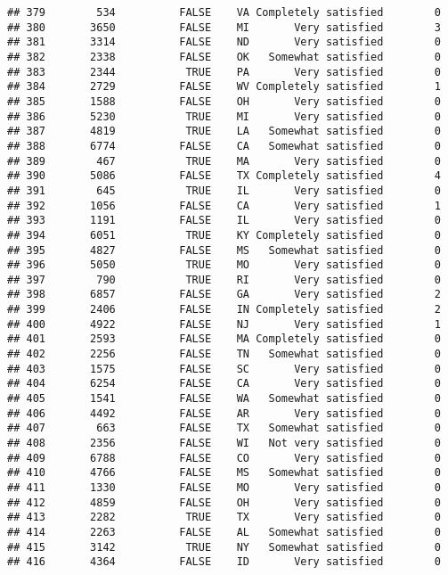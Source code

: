 \documentclass[]{book}
\theoremstyle{definition}
\theoremstyle{definition}
\theoremstyle{remark}
\begin{document}
\begin{verbatim}
## 379        534          FALSE    VA Completely satisfied        0
## 380       3650          FALSE    MI       Very satisfied        3
## 381       3314          FALSE    ND       Very satisfied        0
## 382       2338          FALSE    OK   Somewhat satisfied        0
## 383       2344           TRUE    PA       Very satisfied        0
## 384       2729          FALSE    WV Completely satisfied        1
## 385       1588          FALSE    OH       Very satisfied        0
## 386       5230           TRUE    MI       Very satisfied        0
## 387       4819           TRUE    LA   Somewhat satisfied        0
## 388       6774          FALSE    CA   Somewhat satisfied        0
## 389        467           TRUE    MA       Very satisfied        0
## 390       5086          FALSE    TX Completely satisfied        4
## 391        645           TRUE    IL       Very satisfied        0
## 392       1056          FALSE    CA       Very satisfied        1
## 393       1191          FALSE    IL       Very satisfied        0
## 394       6051           TRUE    KY Completely satisfied        0
## 395       4827          FALSE    MS   Somewhat satisfied        0
## 396       5050           TRUE    MO       Very satisfied        0
## 397        790           TRUE    RI       Very satisfied        0
## 398       6857          FALSE    GA       Very satisfied        2
## 399       2406          FALSE    IN Completely satisfied        2
## 400       4922          FALSE    NJ       Very satisfied        1
## 401       2593          FALSE    MA Completely satisfied        0
## 402       2256          FALSE    TN   Somewhat satisfied        0
## 403       1575          FALSE    SC       Very satisfied        0
## 404       6254          FALSE    CA       Very satisfied        0
## 405       1541          FALSE    WA   Somewhat satisfied        0
## 406       4492          FALSE    AR       Very satisfied        0
## 407        663          FALSE    TX   Somewhat satisfied        0
## 408       2356          FALSE    WI   Not very satisfied        0
## 409       6788          FALSE    CO       Very satisfied        0
## 410       4766          FALSE    MS   Somewhat satisfied        0
## 411       1330          FALSE    MO       Very satisfied        0
## 412       4859          FALSE    OH       Very satisfied        0
## 413       2282           TRUE    TX       Very satisfied        0
## 414       2263          FALSE    AL   Somewhat satisfied        0
## 415       3142           TRUE    NY   Somewhat satisfied        0
## 416       4364          FALSE    ID       Very satisfied        0

\end{verbatim}
\end{document}
